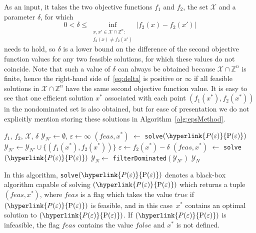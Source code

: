 \documentclass{article}
\newcommand{\myrefmath}[1]{(\hyperlink{#1}{\mathrm{#1}})}
\newcommand{\epsConstraint}{$\varepsilon$\text{-constraint}\xspace}
\begin{document}
As an input, it takes the two objective functions $f_1$ and $f_2$, the set $\mathcal{X}$ and a parameter $\delta$, for which 
\begin{equation} 
\label{eq:delta}
0 < \delta \leq \inf_{\substack{x,x' \in \mathcal{X} \cap \mathbb Z^n:\\ f_2(x) \neq f_2(x')}} |f_2(x) - f_2(x')|
\end{equation}
needs to hold, so $\delta$ is a lower bound on the difference of the second objective function values for any two feasible solutions, for which these values do not coincide. Note that such a value of $\delta$ can always be obtained because $\mathcal{X} \cap \mathbb Z^n$ is finite, hence the right-hand side of~\eqref{eq:delta} is positive or $\infty$ if all feasible solutions in $\mathcal{X} \cap \mathbb Z^n$ have the same second objective function value.
It is easy to see that one efficient solution $x^*$ associated with each point $(f_1(x^*), f_2(x^*))$ in the nondominated set is also obtained, but for ease of presentation we do not explicitly mention storing these solutions in Algorithm~\ref{alg:epsMethod}.

\begin{algorithm}[h!tb]
    \caption{\epsConstraint method for BOIPs}\label{alg:epsMethod}
\begin{algorithmic}[1]
    \Require $f_1$, $f_2$, $\mathcal{X}$, $\delta$
    \State $\mathcal{Y}_{N'} \gets \emptyset$, $\varepsilon \gets \infty$
    \State $(feas, x^*)$ $\gets $ \texttt{solve}$\myrefmath{P(\varepsilon)}$
        \State $\mathcal{Y}_{N'} \gets \mathcal{Y}_{N'} \cup \{(f_1(x^*), f_2(x^*))\}$
        \State $\varepsilon \gets f_2(x^*) - \delta$
        \State $(feas, x^*)$ $\gets $ \texttt{solve}$\myrefmath{P(\varepsilon)}$
    \EndWhile
    \State $\mathcal{Y}_N \gets$ \texttt{filterDominated}$(\mathcal Y_{N'})$ \label{alg:weakline}
    \State \Return $\mathcal{Y}_N$
\end{algorithmic}
\end{algorithm}

In this algorithm, \texttt{solve}$\myrefmath{P(\varepsilon)}$ denotes a black-box algorithm capable of solving $\myrefmath{P(\varepsilon)}$ which returns a tuple $(feas,x^*)$, where $feas$ is a flag which takes the value $true$ if $\myrefmath{P(\varepsilon)}$ is feasible, and in this case~$x^*$ contains an optimal solution to $\myrefmath{P(\varepsilon)}$. If $\myrefmath{P(\varepsilon)}$ is infeasible, the flag $feas$ contains the value $false$ and $x^*$ is not defined.
\end{document}

